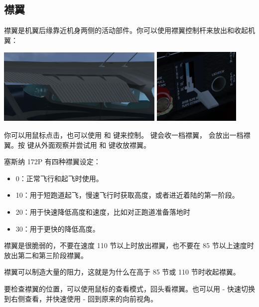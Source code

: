 \subsection{襟翼} 
\label{sec:Flaps}

襟翼是机翼后缘靠近机身两侧的活动部件。你可以使用襟翼控制杆来放出和收起机翼：

\centerline{
  \includegraphics[width=0.6\textwidth]{img/basic_tutorial/flaps}
  \includegraphics[width=0.315\textwidth]{img/basic_tutorial/flaps-ctl}
}

你可以用鼠标点击，也可以使用 \key{[} 和 \key{]} 键来控制。 \key{[} 键会收一档襟翼，\key{]} 会放出一档襟翼。按   键从外面观察并尝试用 \key{[} 和 \key{]} 键收放襟翼。

塞斯纳 172P 有四种襟翼设定：
\begin{itemize}
    \item 0\textdegree{}：正常飞行和起飞时使用。
    \item 10\textdegree{}：用于短跑道起飞，慢速飞行时获取高度，或者进近着陆的第一阶段。
    \item 20\textdegree{}：用于快速降低高度和速度，比如对正跑道准备落地时 
    \item 30\textdegree{}：用于更快的降低高度。
\end{itemize}

襟翼是很脆弱的，不要在速度 110 节以上时放出襟翼，也不要在 85 节以上速度时放出第二和第三阶段襟翼。

襟翼可以制造大量的阻力，这就是为什么在高于 85 节或 110 节时收起襟翼。

要检查襟翼的位置，可以使用鼠标的查看模式，回头看襟翼。也可以用 - 快速切换到右侧查看，并快速使用 - 回到原来的向前视角。

